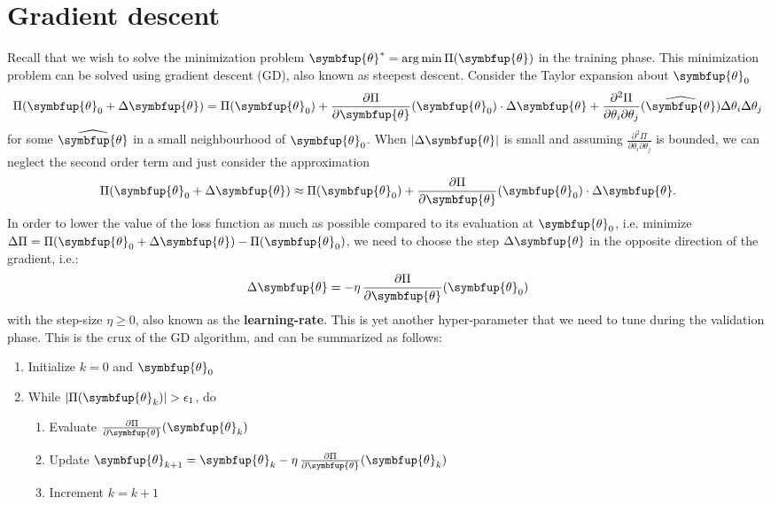 \documentclass[11pt]{extarticle}
\theoremstyle{definition}
\newcommand{\btheta}{\symbfup{\theta}}
\newcommand{\df}[2]{\frac{\partial #1}{\partial #2}}
\DeclareMathOperator*{\amin}{\rm{\arg \min}}
\begin{document}
\section*{Gradient descent}
Recall that we wish to solve the minimization problem $\btheta^* = \amin \Pi(\btheta)$ in the training phase. This minimization problem can be solved using gradient descent (GD), also known as steepest descent. Consider the Taylor expansion about $\btheta_0$
\begin{align*}
  \Pi(\btheta_0 + \Delta \btheta) = \Pi(\btheta_0) + \df{\Pi}{\btheta}(\btheta_0) \cdot \Delta \btheta + \df{^2\Pi}{\theta_i\partial\theta_j}(\widehat{\btheta}) \Delta \theta_i \Delta \theta_j
\end{align*}
for some $\widehat{\btheta}$ in a small neighbourhood of $\btheta_0$. When $|\Delta \btheta |$ is small and assuming $\df{^2\Pi}{\theta_i\partial\theta_j}$ is bounded, we can neglect the second order term and just consider the approximation
\begin{align*}
\Pi(\btheta_0 + \Delta \btheta) \approx \Pi(\btheta_0) + \df{\Pi}{\btheta}(\btheta_0) \cdot \Delta \btheta. 
\end{align*}
In order to lower the value of the loss function as much as possible compared to its evaluation at $\btheta_0$, i.e. minimize $\Delta \Pi = \Pi(\btheta_0 + \Delta \btheta) - \Pi(\btheta_0)$, we need to choose the step $\Delta\btheta$ in the opposite direction of the gradient, i.e.:
\begin{align*}
  \Delta \btheta = - \eta\,\df{\Pi}{\btheta}(\btheta_0)
\end{align*}
with the step-size $\eta \geqslant 0$, also known as the \textbf{learning-rate}. This is yet another hyper-parameter that we need to tune during the validation phase. This is the crux of the GD algorithm, and can be summarized as follows:
\begin{enumerate}
  \item Initialize $k=0$ and $\btheta_0$
  \item While $|\Pi(\btheta_k)| > \epsilon_1$, do
    \begin{enumerate}
      \item Evaluate $\df{\Pi}{\btheta}(\btheta_k)$
      \item Update $\btheta_{k+1} = \btheta_k - \eta\,\df{\Pi}{\btheta}(\btheta_k)$
      \item Increment $k = k + 1$
    \end{enumerate}
\end{enumerate}
\end{document}
